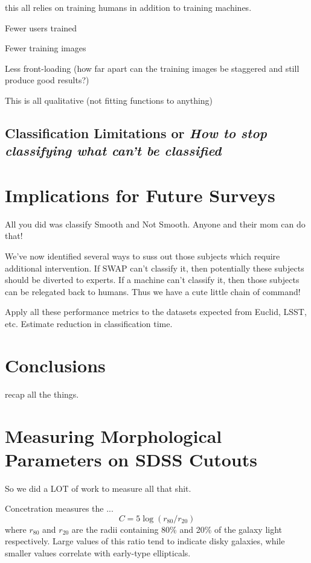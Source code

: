 \documentclass[twocolumn]{aastex6}
\newcommand{\rr}[1]{$r_{#1}$}
\begin{document}
this all relies on training humans in addition to training machines. 

Fewer users trained

Fewer training images

Less front-loading (how far apart can the training images be staggered and still produce good results?)

This is all qualitative (not fitting functions to anything)

\subsection{Classification Limitations or \textit{How to stop classifying what can't be classified}}

\section{Implications for Future Surveys}
All you did was classify Smooth and Not Smooth. Anyone and their mom can do that!


We've now identified several ways to suss out those subjects which require 
additional intervention. If SWAP can't classify it, then potentially these subjects 
should be diverted to experts. If a machine can't classify it, then those subjects
can be relegated back to humans. Thus we have a cute little chain of command!

Apply all these performance metrics to the datasets expected from Euclid, LSST, etc. Estimate reduction in classification time. 

\section{Conclusions}

recap all the things. 








\appendix

\section{Measuring Morphological Parameters on SDSS Cutouts}
\label{sec:Appendix}

So we did a LOT of work to measure all that shit. 


Concetration measures the ... 
\begin{equation}
C = 5\log(r_{80}/ r_{20})
\end{equation}
where \rr{80} and \rr{20} are the radii containing 80\% and 20\% of the galaxy light respectively.  Large values of this ratio tend to indicate disky galaxies, while smaller values correlate with early-type ellipticals. 
\end{document}
